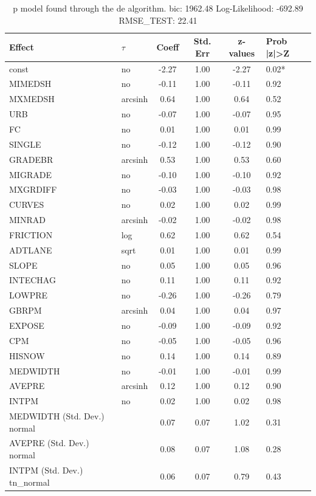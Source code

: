 \begin{table}
	\caption{p model found through the de algorithm. bic: 1962.48 Log-Likelihood: -692.89 RMSE_TEST: 22.41}
	\begin{center}
		\begin{tabular}{|l|l|c|c|c|l|}
			\hline
			Effect & $\tau$ & Coeff & Std. Err & z-values & Prob |z|>Z \\
			\hline
			const & no & -2.27 & 1.00 & -2.27 & 0.02* \\
			\hline
			MIMEDSH & no & -0.11 & 1.00 & -0.11 & 0.92 \\
			\hline
			MXMEDSH & arcsinh & 0.64 & 1.00 & 0.64 & 0.52 \\
			\hline
			URB & no & -0.07 & 1.00 & -0.07 & 0.95 \\
			\hline
			FC & no & 0.01 & 1.00 & 0.01 & 0.99 \\
			\hline
			SINGLE & no & -0.12 & 1.00 & -0.12 & 0.90 \\
			\hline
			GRADEBR & arcsinh & 0.53 & 1.00 & 0.53 & 0.60 \\
			\hline
			MIGRADE & no & -0.10 & 1.00 & -0.10 & 0.92 \\
			\hline
			MXGRDIFF & no & -0.03 & 1.00 & -0.03 & 0.98 \\
			\hline
			CURVES & no & 0.02 & 1.00 & 0.02 & 0.99 \\
			\hline
			MINRAD & arcsinh & -0.02 & 1.00 & -0.02 & 0.98 \\
			\hline
			FRICTION & log & 0.62 & 1.00 & 0.62 & 0.54 \\
			\hline
			ADTLANE & sqrt & 0.01 & 1.00 & 0.01 & 0.99 \\
			\hline
			SLOPE & no & 0.05 & 1.00 & 0.05 & 0.96 \\
			\hline
			INTECHAG & no & 0.11 & 1.00 & 0.11 & 0.92 \\
			\hline
			LOWPRE & no & -0.26 & 1.00 & -0.26 & 0.79 \\
			\hline
			GBRPM & arcsinh & 0.04 & 1.00 & 0.04 & 0.97 \\
			\hline
			EXPOSE & no & -0.09 & 1.00 & -0.09 & 0.92 \\
			\hline
			CPM & no & -0.05 & 1.00 & -0.05 & 0.96 \\
			\hline
			HISNOW & no & 0.14 & 1.00 & 0.14 & 0.89 \\
			\hline
			MEDWIDTH & no & -0.01 & 1.00 & -0.01 & 0.99 \\
			\hline
			AVEPRE & arcsinh & 0.12 & 1.00 & 0.12 & 0.90 \\
			\hline
			INTPM & no & 0.02 & 1.00 & 0.02 & 0.98 \\
			\hline
			MEDWIDTH (Std. Dev.) normal &  & 0.07 & 0.07 & 1.02 & 0.31 \\
			\hline
			AVEPRE (Std. Dev.) normal &  & 0.08 & 0.07 & 1.08 & 0.28 \\
			\hline
			INTPM (Std. Dev.) tn_normal &  & 0.06 & 0.07 & 0.79 & 0.43 \\
			\hline
		\end{tabular}
	\end{center}
\end{table}